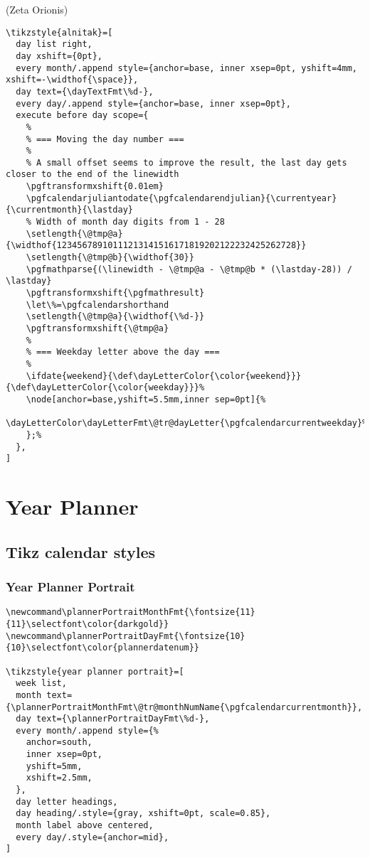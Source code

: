 \documentclass[11pt,oneside]{memoir-article}
\begin{document}
(Zeta Orionis)

\begin{verbatim}
\tikzstyle{alnitak}=[
  day list right,
  day xshift={0pt},
  every month/.append style={anchor=base, inner xsep=0pt, yshift=4mm, xshift=-\widthof{\space}},
  day text={\dayTextFmt\%d-},
  every day/.append style={anchor=base, inner xsep=0pt},
  execute before day scope={
    %
    % === Moving the day number ===
    %
    % A small offset seems to improve the result, the last day gets closer to the end of the linewidth
    \pgftransformxshift{0.01em}
    \pgfcalendarjuliantodate{\pgfcalendarendjulian}{\currentyear}{\currentmonth}{\lastday}
    % Width of month day digits from 1 - 28
    \setlength{\@tmp@a}{\widthof{12345678910111213141516171819202122232425262728}}
    \setlength{\@tmp@b}{\widthof{30}}
    \pgfmathparse{(\linewidth - \@tmp@a - \@tmp@b * (\lastday-28)) / \lastday}
    \pgftransformxshift{\pgfmathresult}
    \let\%=\pgfcalendarshorthand
    \setlength{\@tmp@a}{\widthof{\%d-}}
    \pgftransformxshift{\@tmp@a}
    %
    % === Weekday letter above the day ===
    %
    \ifdate{weekend}{\def\dayLetterColor{\color{weekend}}}{\def\dayLetterColor{\color{weekday}}}%
    \node[anchor=base,yshift=5.5mm,inner sep=0pt]{%
      \dayLetterColor\dayLetterFmt\@tr@dayLetter{\pgfcalendarcurrentweekday}%
    };%
  },
]
\end{verbatim}

\chapter{Year Planner}
\label{sec:org637b4c5}
\section{Tikz calendar styles}
\label{sec:orgf6d2a8d}
\subsection{Year Planner Portrait}
\label{sec:org17ac9dd}

\begin{verbatim}
\newcommand\plannerPortraitMonthFmt{\fontsize{11}{11}\selectfont\color{darkgold}}
\newcommand\plannerPortraitDayFmt{\fontsize{10}{10}\selectfont\color{plannerdatenum}}

\tikzstyle{year planner portrait}=[
  week list,
  month text={\plannerPortraitMonthFmt\@tr@monthNumName{\pgfcalendarcurrentmonth}},
  day text={\plannerPortraitDayFmt\%d-},
  every month/.append style={%
    anchor=south,
    inner xsep=0pt,
    yshift=5mm,
    xshift=2.5mm,
  },
  day letter headings,
  day heading/.style={gray, xshift=0pt, scale=0.85},
  month label above centered,
  every day/.style={anchor=mid},
]
\end{verbatim}
\end{document}
